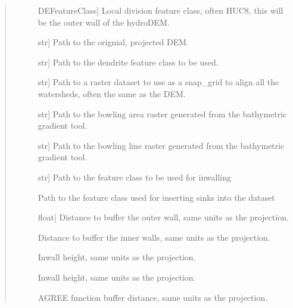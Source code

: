 \documentclass[letterpaper,10pt,english]{sphinxmanual}
\begin{document}
\begin{fulllineitems}
\begin{quote}
\begin{description}
\begin{description}
\item[{}] \leavevmode{[}DEFeatureClass{]}
Local division feature class, often HUC8, this will be the outer wall of the hydroDEM.

\item[{}] \leavevmode{[}str{]}
Path to the orignial, projected DEM.

\item[{}] \leavevmode{[}str{]}
Path to the dendrite feature class to be used.

\item[{}] \leavevmode{[}str{]}
Path to a raster dataset to use as a snap\_grid to align all the watersheds, often the same as the DEM.

\item[{}] \leavevmode{[}str{]}
Path to the bowling area raster generated from the bathymetric gradient tool.

\item[{}] \leavevmode{[}str{]}
Path to the bowling line raster generated from the bathymetric gradient tool.

\item[{}] \leavevmode{[}str{]}
Path to the feature class to be used for inwalling

\item[{}] \leavevmode
Path to the feature class used for inserting sinks into the dataset

\item[{}] \leavevmode{[}float{]}
Distance to buffer the outer wall, same units as the projection.

\item[{}] \leavevmode
Distance to buffer the inner walls, same units as the projection.

\item[{}] \leavevmode
Inwall height, same units as the projection.

\item[{}] \leavevmode
Inwall height, same units as the projection.

\item[{}] \leavevmode
AGREE function buffer distance, same units as the projection.


\end{description}
\end{description}
\end{quote}
\end{fulllineitems}
\end{document}
